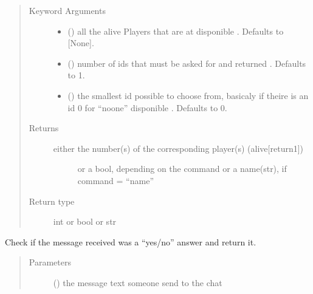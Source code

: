 \documentclass[letterpaper,10pt,english]{sphinxmanual}
\begin{document}
\begin{fulllineitems}
\begin{fulllineitems}
\begin{quote}
\begin{description}
\item[{Keyword Arguments}] \leavevmode\begin{itemize}
\item {} 
 (\sphinxstyleliteralemphasis{\sphinxupquote{, }}) \textendash{} all the alive Players that are at disponible . Defaults to {[}None{]}.

\item {} 
 (\sphinxstyleliteralemphasis{\sphinxupquote{, }}) \textendash{} number of ids that must be asked for and returned . Defaults to 1.

\item {} 
 (\sphinxstyleliteralemphasis{\sphinxupquote{, }}) \textendash{} the smallest id possible to choose from,
basicaly if theire is an id 0 for “noone” disponible . Defaults to 0.

\end{itemize}

\item[{Returns}] \leavevmode
\begin{description}
\item[{either the number(s) of the corresponding player(s) (alive{[}return\sphinxhyphen{}1{]})}] \leavevmode
or a bool, depending on the command
or a name(str), if command = “name”

\end{description}


\item[{Return type}] \leavevmode
int or bool or str

\end{description}\end{quote}

\end{fulllineitems}


\begin{fulllineitems}
\label{\detokenize{chatwolf:chatwolf.skypecommands.SkypeCommands.get_bool}}
Check if the message received was a “yes/no” answer and return it.
\begin{quote}\begin{description}
\item[{Parameters}] \leavevmode
{} () \textendash{} the message text someone send to the chat


\end{description}
\end{quote}
\end{fulllineitems}
\end{fulllineitems}
\end{document}
